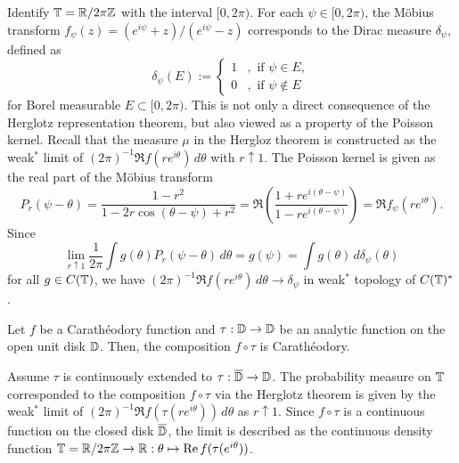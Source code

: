 \documentclass[a4paper]{article}
\begin{document}
\begin{ex}
Identify $\mathbb{T}=\mathbb{R}/2\pi\mathbb{Z}$ with the interval $[0,2\pi)$.
For each $\psi\in[0,2\pi)$, the M\"obius transform $f_\psi(z)=(e^{i\psi}+z)/(e^{i\psi}-z)$ corresponds to the Dirac measure $\delta_\psi$, defined as
\[\delta_\psi(E):=\begin{cases}1&,\text{ if }\psi\in E,\\0&,\text{ if }\psi\notin E\end{cases}\]
for Borel measurable $E\subset[0,2\pi)$.
This is not only a direct consequence of the Herglotz representation theorem, but also viewed as a property of the Poisson kernel.
Recall that the measure $\mu$ in the Hergloz theorem is constructed as the weak$^*$ limit of $(2\pi)^{-1}\Re f(re^{i\theta})\,d\theta$ with $r\uparrow1$.
The Poisson kernel is given as the real part of the M\"obius transform
\[P_r(\psi-\theta)=\frac{1-r^2}{1-2r\cos(\theta-\psi)+r^2}=\Re\left(\frac{1+re^{i(\theta-\psi)}}{1-re^{i(\theta-\psi)}}\right)=\Re f_\psi(re^{i\theta}).\]
Since
\[\lim_{r\uparrow1}\frac1{2\pi}\int g(\theta)P_r(\psi-\theta)\,d\theta=g(\psi)=\int g(\theta)\,d\delta_\psi(\theta)\]
for all $g\in C(\mathbb{T})$, we have $(2\pi)^{-1}\Re f(re^{i\theta})\,d\theta\to\delta_\psi$ in weak$^*$ topology of $C(\mathbb{T})^*$.
\end{ex}


\begin{ex}
Let $f$ be a Carath\'eodory function and $\tau:\mathbb{D}\to\mathbb{D}$ be an analytic function on the open unit disk $\mathbb{D}$.
Then, the composition $f\circ\tau$ is Carath\'eodory.

Assume $\tau$ is continuously extended to $\tau:\overline{\mathbb{D}}\to\mathbb{D}$.
The probability measure on $\mathbb{T}$ corresponded to the composition $f\circ\tau$ via the Herglotz theorem is given by the weak$^*$ limit of $(2\pi)^{-1}\Re f(\tau(re^{i\theta}))\,d\theta$ as $r\uparrow1$.
Since $f\circ\tau$ is a continuous function on the closed disk $\overline{\mathbb{D}}$, the limit is described as the continuous density function $\mathbb{T}=\mathbb{R}/2\pi\mathbb{Z}\to\mathbb{R}:\theta\mapsto\operatorname{Re} f(\tau(e^{i\theta}))$.
\end{ex}
\end{document}
